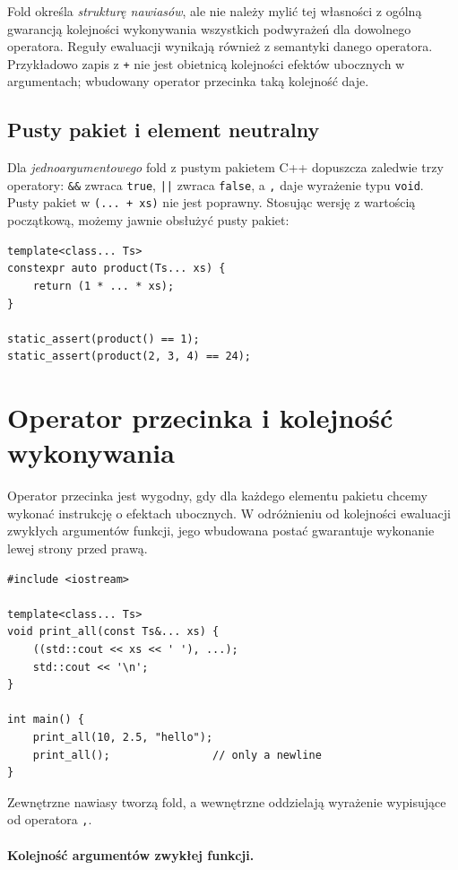 Fold określa \emph{strukturę nawiasów}, ale nie należy mylić tej
własności z ogólną gwarancją kolejności wykonywania wszystkich
podwyrażeń dla dowolnego operatora. Reguły ewaluacji wynikają
również z semantyki danego operatora. Przykładowo zapis z
\texttt{+} nie jest obietnicą kolejności efektów ubocznych
w argumentach; wbudowany operator przecinka taką kolejność daje.

\subsection{Pusty pakiet i element neutralny}

Dla \emph{jednoargumentowego} fold z pustym pakietem C++ dopuszcza
zaledwie trzy operatory: \texttt{\&\&} zwraca \texttt{true},
\texttt{||} zwraca \texttt{false}, a \texttt{,} daje
wyrażenie typu \texttt{void}. Pusty pakiet w
\texttt{(... + xs)} nie jest poprawny. Stosując wersję
z wartością początkową, możemy jawnie obsłużyć pusty pakiet:

\begin{lstlisting}
template<class... Ts>
constexpr auto product(Ts... xs) {
    return (1 * ... * xs);
}

static_assert(product() == 1);
static_assert(product(2, 3, 4) == 24);
\end{lstlisting}

\section{Operator przecinka i kolejność wykonywania}
\label{sec:variadic-przecinek}

Operator przecinka jest wygodny, gdy dla każdego elementu pakietu
chcemy wykonać instrukcję o efektach ubocznych. W odróżnieniu
od kolejności ewaluacji zwykłych argumentów funkcji, jego
wbudowana postać gwarantuje wykonanie lewej strony przed prawą.

\begin{lstlisting}
#include <iostream>

template<class... Ts>
void print_all(const Ts&... xs) {
    ((std::cout << xs << ' '), ...);
    std::cout << '\n';
}

int main() {
    print_all(10, 2.5, "hello");
    print_all();                // only a newline
}
\end{lstlisting}

Zewnętrzne nawiasy tworzą fold, a wewnętrzne oddzielają
wyrażenie wypisujące od operatora \texttt{,}.

\paragraph{Kolejność argumentów zwykłej funkcji.}

